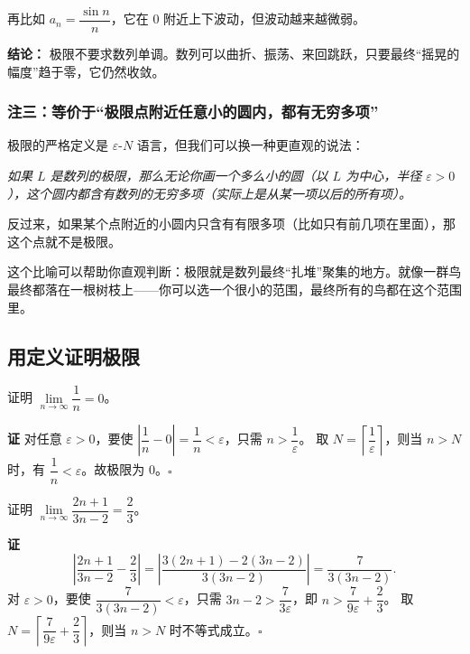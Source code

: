 \documentclass{ctexart}
\newenvironment{custom}[1]{\par\noindent \textbf{#1}\quad}{\par\vspace{1em}}
\begin{document}
再比如 \(a_n = \dfrac{\sin n}{n}\)，它在 0 附近上下波动，但波动越来越微弱。

\textbf{结论：} 极限不要求数列单调。数列可以曲折、振荡、来回跳跃，只要最终“摇晃的幅度”趋于零，它仍然收敛。

\subsubsection{注三：等价于“极限点附近任意小的圆内，都有无穷多项”}

极限的严格定义是 \(\varepsilon\)-\(N\) 语言，但我们可以换一种更直观的说法：

\emph{如果 \(L\) 是数列的极限，那么无论你画一个多么小的圆（以 \(L\) 为中心，半径 \(\varepsilon > 0\)），这个圆内都含有数列的无穷多项（实际上是从某一项以后的所有项）。}

反过来，如果某个点附近的小圆内只含有有限多项（比如只有前几项在里面），那这个点就不是极限。

这个比喻可以帮助你直观判断：极限就是数列最终“扎堆”聚集的地方。就像一群鸟最终都落在一根树枝上——你可以选一个很小的范围，最终所有的鸟都在这个范围里。

\subsection{用定义证明极限}

\begin{example}
证明 \(\lim\limits_{n\to\infty} \dfrac{1}{n} = 0\)。
\end{example}
\begin{custom}{证}
对任意 \(\varepsilon > 0\)，要使 \(\left|\dfrac{1}{n} - 0\right| = \dfrac{1}{n} < \varepsilon\)，只需 \(n > \dfrac{1}{\varepsilon}\)。
取 \(N = \left\lceil \dfrac{1}{\varepsilon} \right\rceil\)，则当 \(n > N\) 时，有 \(\dfrac{1}{n} < \varepsilon\)。故极限为 0。\(\square\)
\end{custom}

\begin{example}
证明 \(\lim\limits_{n\to\infty} \dfrac{2n+1}{3n-2} = \dfrac{2}{3}\)。
\end{example}
\begin{custom}{证}
\[
\left|\dfrac{2n+1}{3n-2} - \dfrac{2}{3}\right| = \left|\dfrac{3(2n+1)-2(3n-2)}{3(3n-2)}\right| = \dfrac{7}{3(3n-2)}.
\]
对 \(\varepsilon > 0\)，要使 \(\dfrac{7}{3(3n-2)} < \varepsilon\)，只需 \(3n-2 > \dfrac{7}{3\varepsilon}\)，即 \(n > \dfrac{7}{9\varepsilon} + \dfrac{2}{3}\)。
取 \(N = \left\lceil \dfrac{7}{9\varepsilon} + \dfrac{2}{3} \right\rceil\)，则当 \(n > N\) 时不等式成立。\(\square\)
\end{custom}
\end{document}
